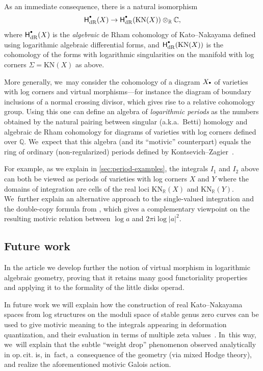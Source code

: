 \documentclass[JEP,XML,SOM,Unicode,NoFloatCountersInSection,published]{cedram}
\let\oldbullet\bullet
\renewcommand{\bullet}{{\raisebox{1pt}{$\scriptscriptstyle\oldbullet$}}}
\theoremstyle{definition}
\theoremstyle{remark}
\let\defn\emph
\newcommand{\CC}{\mathbb{C}}
\newcommand{\RR}{\mathbb{R}}
\newcommand{\QQ}{\mathbb{Q}}
\newcommand{\iu}{\mathrm{i}}
\newcommand{\rbrac}[1]{\left(#1\right)}
\newcommand{\Sig}{\Sigma}
\newcommand{\KN}[1]{\mathrm{KN}(#1)}
\newcommand{\KNR}[1]{\mathrm{KN}_\RR\rbrac{#1}}
\newcommand{\HdR}[2][\bullet]{\mathsf{H}_{\mathrm{dR}}^{#1}(#2)}
\begin{document}
As an immediate consequence, there is a natural isomorphism
\[
\HdR{X} \to \HdR{\KN{X}}\otimes_\RR \CC,
\]
where $\HdR{X}$ is the \emph{algebraic} de Rham cohomology of Kato--Nakayama \cite{KatoNakayama} defined using logarithmic algebraic differential forms, and $\HdR{\KN{X}}$ is the cohomology of the forms with logarithmic singularities on the manifold with log corners $\Sig=\KN{X}$ as above.

More generally, we~may consider the cohomology of a diagram $X_\bullet$ of varieties with log corners and virtual morphisms---for instance the diagram of boundary inclusions of a normal crossing divisor, which gives rise to a relative cohomology group. Using this one can define an algebra of \defn{logarithmic periods} as the numbers obtained by the natural pairing between singular (a.k.a.~Betti) homology and algebraic de Rham cohomology for diagrams of varieties with log corners defined over $\QQ$. We~expect that this algebra (and its ``motivic'' counterpart) equals the ring of ordinary (non-regularized) periods defined by Kontsevich--Zagier~\cite{KontsevichZagier}.

For example, as we explain in \autoref{sec:period-examples}, the integrals $I_1$ and $I_2$ above can both be viewed as periods of varieties with log corners $X$ and $Y$ where the domains of integration are cells of the real loci $\KNR{X}$ and $\KNR{Y}$. We~further explain an alternative approach to the single-valued integration and the double-copy formula from \cite{BrownDupont}, which gives a complementary viewpoint on the resulting motivic relation between $\log a$ and $2\pi\iu \log |a|^2$.

\subsection{Future work}

In the article \cite{DPP:WeakMorphisms} we develop further the notion of virtual morphism in logarithmic algebraic geometry, proving that it retains many good functoriality properties and applying it to the formality of the little disks operad.

In future work we will explain how the construction of real Kato--Nakayama spaces from log structures on the moduli space of stable genus zero curves can be used to give motivic meaning to the integrals appearing in deformation quantization, and their evaluation in terms of multiple zeta values~\cite{BPP}. In~this way, we~will explain that the subtle ``weight drop'' phenomenon observed analytically in {op.\,cit.} is, in~fact, a~consequence of the geometry (via mixed Hodge theory), and realize the aforementioned motivic Galois action.
\end{document}
